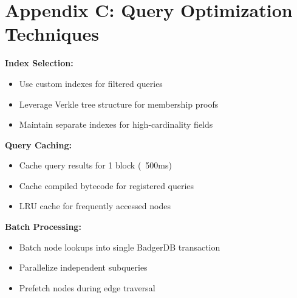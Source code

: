 \section{Appendix C: Query Optimization Techniques}


\textbf{Index Selection:}
\begin{itemize}
\item Use custom indexes for filtered queries
\item Leverage Verkle tree structure for membership proofs
\item Maintain separate indexes for high-cardinality fields
\end{itemize}

\textbf{Query Caching:}
\begin{itemize}
\item Cache query results for 1 block (~500ms)
\item Cache compiled bytecode for registered queries
\item LRU cache for frequently accessed nodes
\end{itemize}

\textbf{Batch Processing:}
\begin{itemize}
\item Batch node lookups into single BadgerDB transaction
\item Parallelize independent subqueries
\item Prefetch nodes during edge traversal
\end{itemize}

